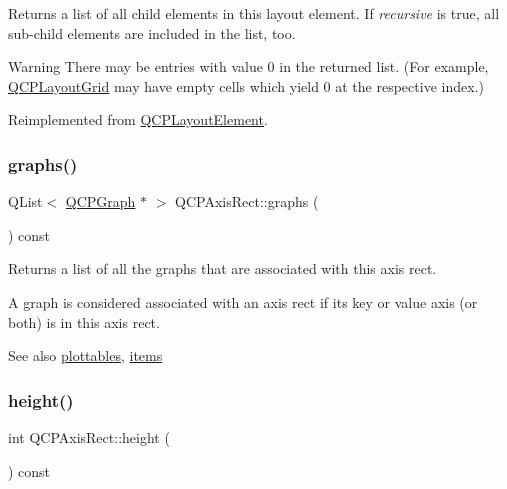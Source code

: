 Returns a list of all child elements in this layout element. If {\itshape recursive} is true, all sub-\/child elements are included in the list, too.

\begin{DoxyWarning}{Warning}
There may be entries with value 0 in the returned list. (For example, \hyperlink{class_q_c_p_layout_grid}{Q\+C\+P\+Layout\+Grid} may have empty cells which yield 0 at the respective index.) 
\end{DoxyWarning}


Reimplemented from \hyperlink{class_q_c_p_layout_element_a76dec8cb31e498994a944d7647a43309}{Q\+C\+P\+Layout\+Element}.

\mbox{\label{class_q_c_p_axis_rect_a2d9ded3eca97be1fcb5867949391bb88}} 
\subsubsection{\texorpdfstring{graphs()}{graphs()}}
{\footnotesize\ttfamily Q\+List$<$ \hyperlink{class_q_c_p_graph}{Q\+C\+P\+Graph} $\ast$ $>$ Q\+C\+P\+Axis\+Rect\+::graphs (\begin{DoxyParamCaption}{ }\end{DoxyParamCaption}) const}

Returns a list of all the graphs that are associated with this axis rect.

A graph is considered associated with an axis rect if its key or value axis (or both) is in this axis rect.

\begin{DoxySeeAlso}{See also}
\hyperlink{class_q_c_p_axis_rect_a587d073a97b27bc7293fab4b2774ad59}{plottables}, \hyperlink{class_q_c_p_axis_rect_a03c113a2175448300ee8f944e24776ba}{items} 
\end{DoxySeeAlso}
\mbox{\label{class_q_c_p_axis_rect_acc4377809e79d9a089ab790f39429b0d}} 
\subsubsection{\texorpdfstring{height()}{height()}}
{\footnotesize\ttfamily int Q\+C\+P\+Axis\+Rect\+::height (\begin{DoxyParamCaption}{ }\end{DoxyParamCaption}) const\hspace{0.3cm}{\ttfamily [inline]}}

